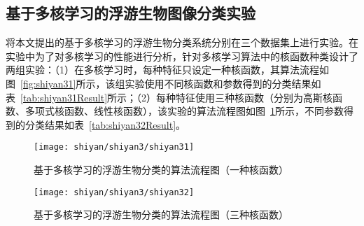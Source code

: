 \subsection{基于多核学习的浮游生物图像分类实验}
\label{sec:ourExperiment}

将本文提出的基于多核学习的浮游生物分类系统分别在三个数据集上进行实验。在实验中为了对多核学习的性能进行分析，针对多核学习算法中的核函数种类设计了两组实验：（1）在多核学习时，每种特征只设定一种核函数，其算法流程如图~\ref{fig:shiyan31}所示，该组实验使用不同核函数和参数得到的分类结果如表~\ref{tab:shiyan31Result}所示；（2）每种特征使用三种核函数（分别为高斯核函数、多项式核函数、线性核函数），该实验的算法流程图如图~\ref{fig:shiyan32}所示，不同参数得到的分类结果如表~\ref{tab:shiyan32Result}。

\begin{figure}
\begin{minipage}{0.48\textwidth}
  \centering
  \texttt{[image: shiyan/shiyan3/shiyan31]}
  \caption{基于多核学习的浮游生物分类的算法流程图（一种核函数）}
  \label{fig:shiyan31}
\end{minipage}\hfill
\begin{minipage}{0.48\textwidth}
  \centering
  \texttt{[image: shiyan/shiyan3/shiyan32]}
  \caption{基于多核学习的浮游生物分类的算法流程图（三种核函数）}
  \label{fig:shiyan32}
\end{minipage}
\end{figure}

